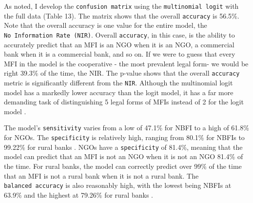 \documentclass[a4paper,nobind]{templates/ociamthesis}
\begin{document}
As noted, I develop the \texttt{confusion\ matrix} using the \texttt{multinomial\ logit} with the full data (Table 13). The matrix shows that the overall \texttt{accuracy} is 56.5\%. Note that the overall accuracy is one value for the entire model, the \texttt{No\ Information\ Rate\ (NIR)}. Overall \texttt{accuracy}, in this case, is the ability to accurately predict that an MFI is an NGO when it is an NGO, a commercial bank when it is a commercial bank, and so on. If we were to guess that every MFI in the model is the cooperative - the most prevalent legal form- we would be right 39.3\% of the time, the NIR. The p-value shows that the overall \texttt{accuracy} metric is significantly different from the \texttt{NIR}. Although the multinomial logit model has a markedly lower accuracy than the logit model, it has a far more demanding task of distinguishing 5 legal forms of MFIs instead of 2 for the logit model \autocite{kwak2002multinomial}.

The model's \texttt{sensitivity} varies from a low of 47.1\% for NBFI to a high of 61.8\% for NGOs. The \texttt{specificity} is relatively high, ranging from 80.1\% for NBFIs to 99.22\% for rural banks \autocite{ginting2019hate}. NGOs have a \texttt{specificity} of 81.4\%, meaning that the model can predict that an MFI is not an NGO when it is not an NGO 81.4\% of the time. For rural banks, the model can correctly predict over 99\% of the time that an MFI is not a rural bank when it is not a rural bank. The \texttt{balanced\ accuracy} is also reasonably high, with the lowest being NBFIs at 63.9\% and the highest at 79.26\% for rural banks \autocite{hedeker2003mixed}.

\newpage
\end{document}
